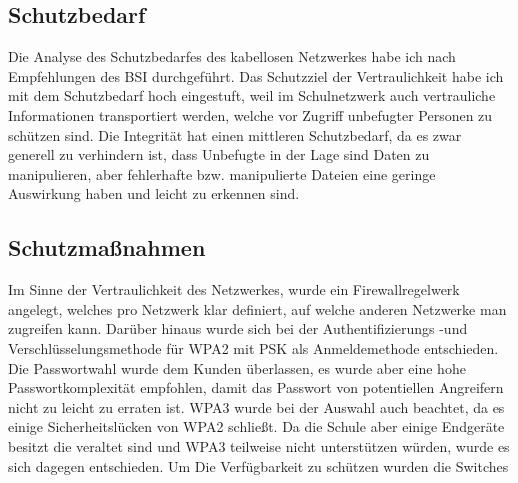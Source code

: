 \subsection{Schutzbedarf}
\label{sec:Schutzbedarf}
Die Analyse des Schutzbedarfes des kabellosen Netzwerkes habe ich nach Empfehlungen des \ac{BSI} durchgeführt. Das Schutzziel der Vertraulichkeit habe ich mit dem Schutzbedarf hoch eingestuft, weil im Schulnetzwerk auch vertrauliche Informationen transportiert werden, welche vor Zugriff unbefugter Personen zu schützen sind. Die Integrität hat einen mittleren Schutzbedarf, da es zwar generell zu verhindern ist, dass Unbefugte in der Lage sind Daten zu manipulieren, aber fehlerhafte bzw. manipulierte Dateien eine geringe Auswirkung haben und leicht zu erkennen sind.


\begin{comment}
	\item Welcher Schutzbedarf  wird an die Anwendung gestellt (\zB hinsichtlich Sicherheit, Wichtigtkeit, ... \etc (siehe \citet{BSI-S-200-2}))?
\end{comment}

\subsection{Schutzmaßnahmen}
\label{sec:Schutzmaßnahmen}
Im Sinne der Vertraulichkeit des Netzwerkes, wurde ein Firewallregelwerk angelegt, welches pro Netzwerk klar definiert, auf welche anderen Netzwerke man zugreifen kann. Darüber hinaus wurde sich bei der Authentifizierungs -und Verschlüsselungsmethode für WPA2 mit \ac{PSK} als Anmeldemethode entschieden. Die Passwortwahl wurde dem Kunden überlassen, es wurde aber eine hohe Passwortkomplexität empfohlen, damit das Passwort von potentiellen Angreifern nicht zu leicht zu erraten ist. WPA3 wurde bei der Auswahl auch beachtet, da es einige Sicherheitslücken von WPA2  schließt. Da die Schule aber einige Endgeräte besitzt die veraltet sind und WPA3 teilweise nicht unterstützen würden, wurde es sich dagegen entschieden. Um Die Verfügbarkeit zu schützen wurden die Switches  
\begin{comment}
	\item Welche Schutznahmen werden unternommen um das System abzichern (\zB gegenüber fremden Zugriff, Sicherheitslücken, Updates, Ausfall des Systems \etc)?
\end{comment}
